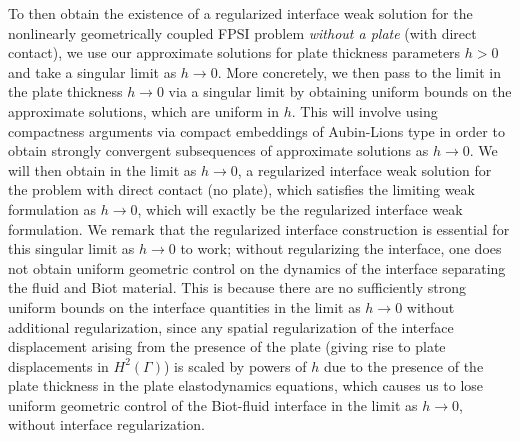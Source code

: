 \documentclass[11pt]{article}
\theoremstyle{definition}
\begin{document}
To then obtain the existence of a regularized interface weak solution for the nonlinearly geometrically coupled FPSI problem \textit{without a plate} (with direct contact), we use our approximate solutions for plate thickness parameters $h > 0$ and take a singular limit as $h \to 0$. More concretely, we then pass to the limit in the plate thickness $h \to 0$ via a singular limit by obtaining uniform bounds on the approximate solutions, which are uniform in $h$. This will involve using compactness arguments via compact embeddings of Aubin-Lions type in order to obtain strongly convergent subsequences of approximate solutions as $h \to 0$. We will then obtain in the limit as $h \to 0$, a regularized interface weak solution for the problem with direct contact (no plate), which satisfies the limiting weak formulation as $h \to 0$, which will exactly be the regularized interface weak formulation. We remark that the regularized interface construction is essential for this singular limit as $h \to 0$ to work; without regularizing the interface, one does not obtain uniform geometric control on the dynamics of the interface separating the fluid and Biot material. This is because there are no sufficiently strong uniform bounds on the interface quantities in the limit as $h \to 0$ without additional regularization, since any spatial regularization of the interface displacement arising from the presence of the plate (giving rise to plate displacements in $H^{2}(\Gamma)$) is scaled by powers of $h$ due to the presence of the plate thickness in the plate elastodynamics equations, which causes us to lose uniform geometric control of the Biot-fluid interface in the limit as $h \to 0$, without interface regularization.
\end{document}
